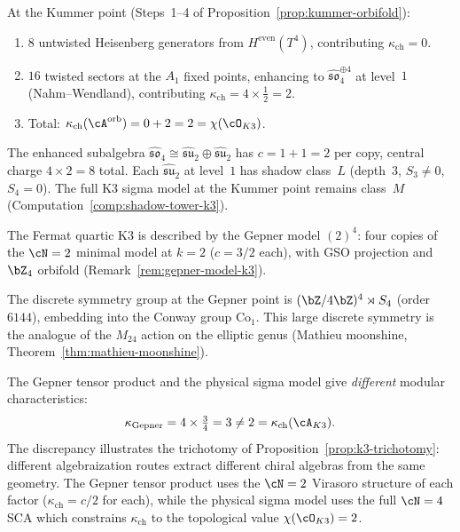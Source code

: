 \begin{remark}
\label{rem:k3-kummer-enhancement}
At the Kummer point (Steps~1--4 of
Proposition~\ref{prop:kummer-orbifold}):
\begin{enumerate}[label=(\roman*)]
\item $8$ untwisted Heisenberg generators from
 $H^{\mathrm{even}}(T^4)$, contributing $\kappa_{\mathrm{ch}} = 0$.
\item $16$ twisted sectors at the $A_1$ fixed points, enhancing
 to $\hat{\mathfrak{so}}_4^{\oplus 4}$ at level~$1$
 (Nahm--Wendland), contributing
 $\kappa_{\mathrm{ch}} = 4 \times \tfrac{1}{2} = 2$.
\item Total: $\kappa_{\mathrm{ch}}(\cA^{\mathrm{orb}}) = 0 + 2 = 2 = \chi(\cO_{K3})$.
\end{enumerate}
The enhanced subalgebra
$\hat{\mathfrak{so}}_4 \cong \hat{\mathfrak{su}}_2 \oplus \hat{\mathfrak{su}}_2$
has $c = 1 + 1 = 2$ per copy, central charge $4 \times 2 = 8$ total.
Each $\hat{\mathfrak{su}}_2$ at level~$1$ has shadow class~$L$ (depth~$3$,
$S_3 \neq 0$, $S_4 = 0$).  The full K3 sigma model at the Kummer point
remains class~$M$ (Computation~\ref{comp:shadow-tower-k3}).
\end{remark}

\begin{remark}
\label{rem:k3-fermat-quartic}
The Fermat quartic K3 is described by the Gepner model $(2)^4$:
four copies of the $\cN = 2$ minimal model at $k = 2$
($c = 3/2$ each), with GSO projection and $\bZ_4$ orbifold
(Remark~\ref{rem:gepner-model-k3}).

The discrete symmetry group at the Gepner point is
$(\bZ/4\bZ)^4 \rtimes S_4$ (order $6144$), embedding into the
Conway group $\mathrm{Co}_1$.  This large discrete symmetry
is the analogue of the $M_{24}$ action on the elliptic genus
(Mathieu moonshine, Theorem~\ref{thm:mathieu-moonshine}).

The Gepner tensor product and the physical sigma model give
\emph{different} modular characteristics:
\[
 \kappa_{\mathrm{Gepner}} = 4 \times \tfrac{3}{4} = 3
 \neq 2 = \kappa_{\mathrm{ch}}(\cA_{K3}).
\]
The discrepancy illustrates the trichotomy of
Proposition~\ref{prop:k3-trichotomy}: different algebraization routes
extract different chiral algebras from the same geometry.
The Gepner tensor product uses the $\cN = 2$ Virasoro structure
of each factor ($\kappa_{\mathrm{ch}} = c/2$ for each), while the
physical sigma model uses the full $\cN = 4$ SCA which constrains
$\kappa_{\mathrm{ch}}$ to the topological value $\chi(\cO_{K3}) = 2$.
\end{remark}

